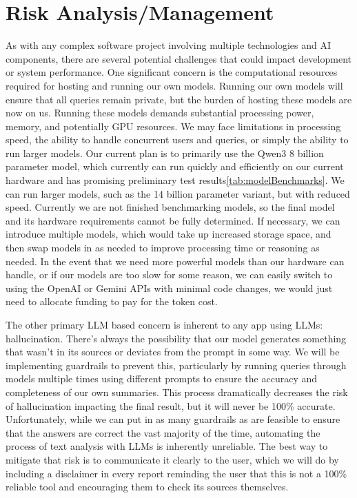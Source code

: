 \documentclass[conference]{IEEEtran}
\begin{document}
\section{Risk Analysis/Management}
As with any complex software project involving multiple technologies and AI components, there are several potential challenges that could impact development or system performance. One significant concern is the computational resources required for hosting and running our own models. Running our own models will ensure that all queries remain private, but the burden of hosting these models are now on us. Running these models demands substantial processing power, memory, and potentially GPU resources. We may face limitations in processing speed, the ability to handle concurrent users and queries, or simply the ability to run larger models. Our current plan is to primarily use the Qwen3 8 billion parameter model, which currently can run quickly and efficiently on our current hardware and has promising preliminary test results\ref{tab:modelBenchmarks}\cite{qwen3}. We can run larger models, such as the 14 billion parameter variant, but with reduced speed. Currently we are not finished benchmarking models, so the final model and its hardware requirements cannot be fully determined. If necessary, we can introduce multiple models, which would take up increased storage space, and then swap models in as needed to improve processing time or reasoning as needed. In the event that we need more powerful models than our hardware can handle, or if our models are too slow for some reason, we can easily switch to using the OpenAI or Gemini APIs with minimal code changes, we would just need to allocate funding to pay for the token cost.

The other primary LLM based concern is inherent to any app using LLMs: hallucination. There's always the possibility that our model generates something that wasn't in its sources or deviates from the prompt in some way. We will be implementing guardrails to prevent this, particularly by running queries through models multiple times using different prompts to ensure the accuracy and completeness of our own summaries. This process dramatically decreases the risk of hallucination impacting the final result, but it will never be 100\% accurate. Unfortunately, while we can put in as many guardrails as are feasible to ensure that the answers are correct the vast majority of the time, automating the process of text analysis with LLMs is inherently unreliable. The best way to mitigate that risk is to communicate it clearly to the user, which we will do by including a disclaimer in every report reminding the user that this is not a 100\% reliable tool and encouraging them to check its sources themselves.
\end{document}
